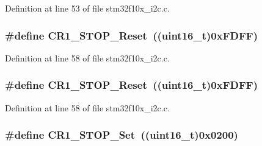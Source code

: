 Definition at line 53 of file stm32f10x\+\_\+i2c.\+c.

\subsubsection[{\texorpdfstring{C\+R1\+\_\+\+S\+T\+O\+P\+\_\+\+Reset}{CR1_STOP_Reset}}]{\setlength{\rightskip}{0pt plus 5cm}\#define C\+R1\+\_\+\+S\+T\+O\+P\+\_\+\+Reset~(({\bf uint16\+\_\+t})0x\+F\+D\+F\+F)}\hypertarget{group___i2_c___private___defines_gac44124bc7b468c7dee8188712e407e02}{}\label{group___i2_c___private___defines_gac44124bc7b468c7dee8188712e407e02}


Definition at line 58 of file stm32f10x\+\_\+i2c.\+c.

\subsubsection[{\texorpdfstring{C\+R1\+\_\+\+S\+T\+O\+P\+\_\+\+Reset}{CR1_STOP_Reset}}]{\setlength{\rightskip}{0pt plus 5cm}\#define C\+R1\+\_\+\+S\+T\+O\+P\+\_\+\+Reset~(({\bf uint16\+\_\+t})0x\+F\+D\+F\+F)}\hypertarget{group___i2_c___private___defines_gac44124bc7b468c7dee8188712e407e02}{}\label{group___i2_c___private___defines_gac44124bc7b468c7dee8188712e407e02}


Definition at line 58 of file stm32f10x\+\_\+i2c.\+c.

\subsubsection[{\texorpdfstring{C\+R1\+\_\+\+S\+T\+O\+P\+\_\+\+Set}{CR1_STOP_Set}}]{\setlength{\rightskip}{0pt plus 5cm}\#define C\+R1\+\_\+\+S\+T\+O\+P\+\_\+\+Set~(({\bf uint16\+\_\+t})0x0200)}\hypertarget{group___i2_c___private___defines_gac14ffc5548d2c30d21c49612c57e52be}{}\label{group___i2_c___private___defines_gac14ffc5548d2c30d21c49612c57e52be}


